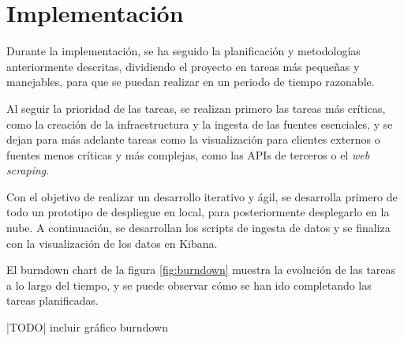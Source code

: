 \chapter{Implementación}
Durante la implementación, se ha seguido la planificación y metodologías
anteriormente descritas, dividiendo el proyecto en tareas más pequeñas y
manejables, para que se puedan realizar en un periodo de tiempo razonable.

Al seguir la prioridad de las tareas, se realizan primero las tareas más
críticas, como la creación de la infraestructura y la ingesta de las fuentes
esenciales, y se dejan para más adelante tareas como la visualización para
clientes externos o fuentes menos críticas y más complejas, como las APIs de
terceros o el \textit{web scraping}.

Con el objetivo de realizar un desarrollo iterativo y ágil, se desarrolla
primero de todo un prototipo de despliegue en local, para posteriormente
desplegarlo en la nube. A continuación, se desarrollan los scripts de ingesta de
datos y se finaliza con la visualización de los datos en Kibana.

El burndown chart de la figura \ref{fig:burndown} muestra la evolución de las
tareas a lo largo del tiempo, y se puede observar cómo se han ido completando
las tareas planificadas.

|TODO| incluir gráfico burndown

\newpage{}


\newpage{}


\newpage{}


\newpage{}

